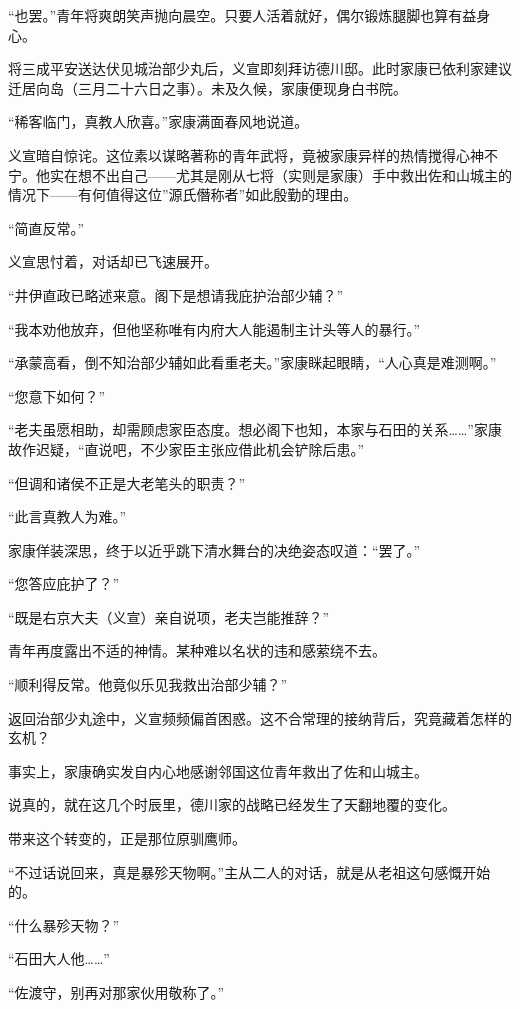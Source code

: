 \documentclass[
]{book}
\begin{document}
``也罢。''青年将爽朗笑声抛向晨空。只要人活着就好，偶尔锻炼腿脚也算有益身心。

将三成平安送达伏见城治部少丸后，义宣即刻拜访德川邸。此时家康已依利家建议迁居向岛（三月二十六日之事）。未及久候，家康便现身白书院。

``稀客临门，真教人欣喜。''家康满面春风地说道。

义宣暗自惊诧。这位素以谋略著称的青年武将，竟被家康异样的热情搅得心神不宁。他实在想不出自己------尤其是刚从七将（实则是家康）手中救出佐和山城主的情况下------有何值得这位''源氏僭称者''如此殷勤的理由。

``简直反常。''

义宣思忖着，对话却已飞速展开。

``井伊直政已略述来意。阁下是想请我庇护治部少辅？''

``我本劝他放弃，但他坚称唯有内府大人能遏制主计头等人的暴行。''

``承蒙高看，倒不知治部少辅如此看重老夫。''家康眯起眼睛，``人心真是难测啊。''

``您意下如何？''

``老夫虽愿相助，却需顾虑家臣态度。想必阁下也知，本家与石田的关系\ldots\ldots{}''家康故作迟疑，``直说吧，不少家臣主张应借此机会铲除后患。''

``但调和诸侯不正是大老笔头的职责？''

``此言真教人为难。''

家康佯装深思，终于以近乎跳下清水舞台的决绝姿态叹道：``罢了。''

``您答应庇护了？''

``既是右京大夫（义宣）亲自说项，老夫岂能推辞？''

青年再度露出不适的神情。某种难以名状的违和感萦绕不去。

``顺利得反常。他竟似乐见我救出治部少辅？''

返回治部少丸途中，义宣频频偏首困惑。这不合常理的接纳背后，究竟藏着怎样的玄机？

事实上，家康确实发自内心地感谢邻国这位青年救出了佐和山城主。

说真的，就在这几个时辰里，德川家的战略已经发生了天翻地覆的变化。

带来这个转变的，正是那位原驯鹰师。

``不过话说回来，真是暴殄天物啊。''主从二人的对话，就是从老祖这句感慨开始的。

``什么暴殄天物？''

``石田大人他\ldots\ldots{}''

``佐渡守，别再对那家伙用敬称了。''
\end{document}

